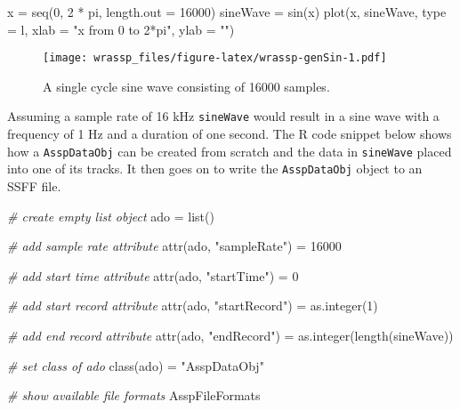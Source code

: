 \documentclass[
]{book}
\newenvironment{Shaded}{\begin{snugshade}}{\end{snugshade}}
\newcommand{\AttributeTok}[1]{\textcolor[rgb]{0.77,0.63,0.00}{#1}}
\newcommand{\CommentTok}[1]{\textcolor[rgb]{0.56,0.35,0.01}{\textit{#1}}}
\newcommand{\DecValTok}[1]{\textcolor[rgb]{0.00,0.00,0.81}{#1}}
\newcommand{\FunctionTok}[1]{\textcolor[rgb]{0.00,0.00,0.00}{#1}}
\newcommand{\NormalTok}[1]{#1}
\newcommand{\OtherTok}[1]{\textcolor[rgb]{0.56,0.35,0.01}{#1}}
\newcommand{\SpecialCharTok}[1]{\textcolor[rgb]{0.00,0.00,0.00}{#1}}
\newcommand{\StringTok}[1]{\textcolor[rgb]{0.31,0.60,0.02}{#1}}
\begin{document}
\begin{Shaded}
\begin{Highlighting}[]
\NormalTok{x }\OtherTok{=} \FunctionTok{seq}\NormalTok{(}\DecValTok{0}\NormalTok{, }\DecValTok{2} \SpecialCharTok{*}\NormalTok{ pi, }\AttributeTok{length.out =} \DecValTok{16000}\NormalTok{)}
\NormalTok{sineWave }\OtherTok{=} \FunctionTok{sin}\NormalTok{(x)}
\FunctionTok{plot}\NormalTok{(x, sineWave, }\AttributeTok{type =} \StringTok{\textquotesingle{}l\textquotesingle{}}\NormalTok{,}
     \AttributeTok{xlab =} \StringTok{"x from 0 to 2*pi"}\NormalTok{,}
     \AttributeTok{ylab =} \StringTok{""}\NormalTok{)}
\end{Highlighting}
\end{Shaded}

\begin{figure}
\centering
\texttt{[image: wrassp\_files/figure-latex/wrassp-genSin-1.pdf]}
\caption{\label{fig:wrassp-genSin}A single cycle sine wave consisting of 16000 samples.}
\end{figure}

Assuming a sample rate of 16 kHz \texttt{sineWave} would result in a sine wave with a frequency of 1 Hz and a duration of one second. The R code snippet below shows how a \texttt{AsspDataObj} can be created from scratch and the data in \texttt{sineWave} placed into one of its tracks. It then goes on to write the \texttt{AsspDataObj} object to an SSFF file.

\begin{Shaded}
\begin{Highlighting}[]
\CommentTok{\# create empty list object}
\NormalTok{ado }\OtherTok{=} \FunctionTok{list}\NormalTok{()}

\CommentTok{\# add sample rate attribute}
\FunctionTok{attr}\NormalTok{(ado, }\StringTok{"sampleRate"}\NormalTok{) }\OtherTok{=} \DecValTok{16000}

\CommentTok{\# add start time attribute}
\FunctionTok{attr}\NormalTok{(ado, }\StringTok{"startTime"}\NormalTok{) }\OtherTok{=} \DecValTok{0}

\CommentTok{\# add start record attribute}
\FunctionTok{attr}\NormalTok{(ado, }\StringTok{"startRecord"}\NormalTok{) }\OtherTok{=} \FunctionTok{as.integer}\NormalTok{(}\DecValTok{1}\NormalTok{)}

\CommentTok{\# add end record attribute}
\FunctionTok{attr}\NormalTok{(ado, }\StringTok{"endRecord"}\NormalTok{) }\OtherTok{=} \FunctionTok{as.integer}\NormalTok{(}\FunctionTok{length}\NormalTok{(sineWave))}

\CommentTok{\# set class of ado}
\FunctionTok{class}\NormalTok{(ado) }\OtherTok{=} \StringTok{"AsspDataObj"}

\CommentTok{\# show available file formats}
\NormalTok{AsspFileFormats}
\end{Highlighting}
\end{Shaded}
\end{document}
